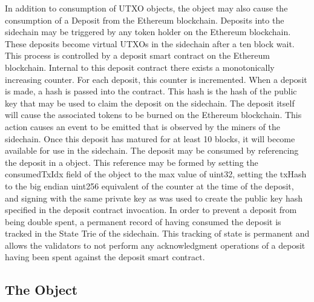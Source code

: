 In addition to consumption of \LayerTwo{} UTXO objects, the \TxIn{} object
may also cause the consumption of a Deposit from the Ethereum
blockchain.
Deposits into the sidechain may be triggered by any token holder on the
Ethereum blockchain.
These deposits become virtual UTXOs in the sidechain after a ten block
wait.
This process is controlled by a deposit smart contract on the Ethereum
blockchain.
Internal to this deposit contract there exists a monotonically
increasing counter.
For each deposit, this counter is incremented.
When a deposit is made, a hash is passed into the contract.
This hash is the hash of the public key that may be used to claim the
deposit on the sidechain.
The deposit itself will cause the associated tokens to be burned on the
Ethereum blockchain.
This action causes an event to be emitted that is observed by the
miners of the sidechain.
Once this deposit has matured for at least 10 blocks, it will become
available for use in the sidechain.
The deposit may be consumed by referencing the deposit in a \TxIn{} object.
This reference may be formed by setting the consumedTxIdx field of the
\TxIn{} object to the max value of uint32, setting the txHash to the big
endian uint256 equivalent of the counter at the time of the deposit,
and signing with the same private key as was used to create the public
key hash specified in the deposit contract invocation.
In order to prevent a deposit from being double spent, a permanent
record of having consumed the deposit is tracked in the State Trie of
the sidechain.
This tracking of state is permanent and allows the validators to not
perform any acknowledgment operations of a deposit having been spent
against the deposit smart contract.


\subsection{The \DataStore{} Object}



